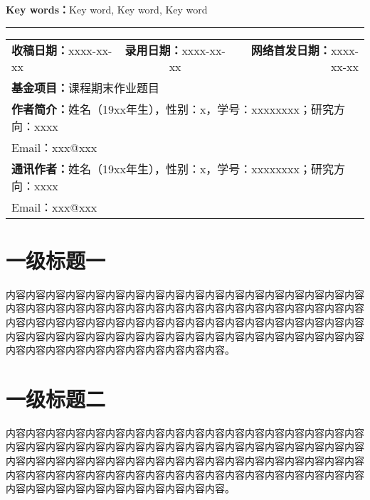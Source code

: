 \documentclass{article}
\newcommand{\sihao}{\fontsize{14pt}{\baselineskip}\selectfont}
\newcommand{\xiaowuhao}{\fontsize{9pt}{\baselineskip}\selectfont}
\begin{document}
\noindent
\textbf{Key words：}Key word, Key word, Key word

\vspace{2cm}
\noindent\rule{40mm}{0.75pt}

\vspace{5pt}

\noindent %
\renewcommand\arraystretch{1} %
\begin{tabular}{lll}
\rule{0pt}{10pt}\xiaowuhao \textbf{收稿日期：}xxxx-xx-xx & 
\multicolumn{1}{c}{\xiaowuhao \qquad \qquad \textbf{录用日期：}xxxx-xx-xx} & 
\multicolumn{1}{r}{\xiaowuhao \textbf{网络首发日期：}xxxx-xx-xx} \\
\multicolumn{3}{l}{\xiaowuhao \textbf{基金项目：}课程期末作业题目} \\
\multicolumn{3}{l}{\xiaowuhao \textbf{作者简介：}姓名（19xx年生），性别：x，学号：xxxxxxxx；研究方向：xxxx}\\
\multicolumn{3}{l}{\xiaowuhao \qquad \qquad \quad Email：xxx@xxx}   \\
\multicolumn{3}{l}{\xiaowuhao \textbf{通讯作者：}姓名（19xx年生），性别：x，学号：xxxxxxxx；研究方向：xxxx} \\
\multicolumn{3}{l}{\xiaowuhao \qquad \qquad \quad Email：xxx@xxx}                        
\end{tabular}

\clearpage

\section{\bfseries \kaishu \sihao 一级标题一}
内容内容内容内容内容内容内容内容内容内容内容内容内容内容内容内容内容内容内容内容内容内容内容内容内容内容内容内容内容内容内容内容内容内容内容内容内容内容内容内容内容内容内容内容内容内容内容内容内容内容内容内容内容内容内容内容内容内容内容内容内容内容内容内容内容内容内容内容内容内容内容内容内容内容内容内容内容内容内容内容内容内容内容\cite{文献引用案例将2021侵权删}。

\section{\bfseries \kaishu \sihao 一级标题二}
内容内容内容内容内容内容内容内容内容内容内容内容内容内容内容内容内容内容内容内容内容内容内容内容内容内容内容内容内容内容内容内容内容内容内容内容内容内容内容内容内容内容内容内容内容内容内容内容内容内容内容内容内容内容内容内容内容内容内容内容内容内容内容内容内容内容内容内容内容内容内容内容内容内容内容内容内容内容内容内容内容内容内容。
\end{document}
